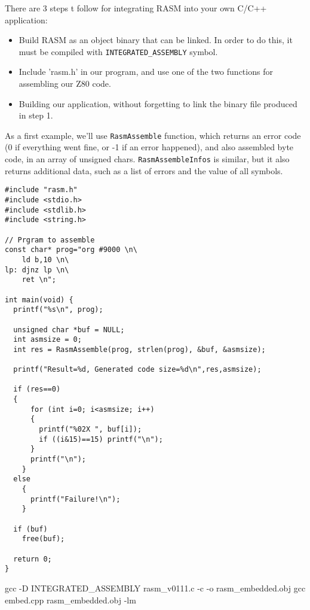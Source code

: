 \begin{xen}
There are 3 steps t follow for integrating  RASM into your own C/C++ application:
\begin{itemize}
\item Build RASM as an object binary that can be linked. In order to do this, it must be compiled with  \texttt{INTEGRATED\_ASSEMBLY} symbol.
\item Include 'rasm.h' in our program, and use one of the two functions for assembling our Z80 code.
\item Building our application, without forgetting to link the binary file produced in step 1.
\end{itemize}

As a first example, we'll use \texttt{RasmAssemble} function, which returns an error code (0 if everything went fine, or -1 if an error happened), and also assembled byte code, in an array of unsigned chars.  
\texttt{RasmAssembleInfos} is similar, but it also returns additional data, such as a list of errors and the value of all symbols. 
\end{xen}


\begin{verbatim}
#include "rasm.h"
#include <stdio.h>
#include <stdlib.h>
#include <string.h>

// Prgram to assemble
const char* prog="org #9000 \n\
    ld b,10 \n\
lp: djnz lp \n\
    ret \n";

int main(void) {
  printf("%s\n", prog);
    
  unsigned char *buf = NULL; 
  int asmsize = 0;
  int res = RasmAssemble(prog, strlen(prog), &buf, &asmsize);    
  
  printf("Result=%d, Generated code size=%d\n",res,asmsize);

  if (res==0)
  {
      for (int i=0; i<asmsize; i++)
      {
        printf("%02X ", buf[i]);
        if ((i&15)==15) printf("\n");
      }
      printf("\n");
    }
  else
    {
      printf("Failure!\n");
    }

  if (buf)
    free(buf);

  return 0;    
}
\end{verbatim}


\begin{code}
gcc -D INTEGRATED\_ASSEMBLY rasm\_v0111.c -c -o rasm\_embedded.obj
gcc embed.cpp rasm\_embedded.obj -lm
\end{code}

